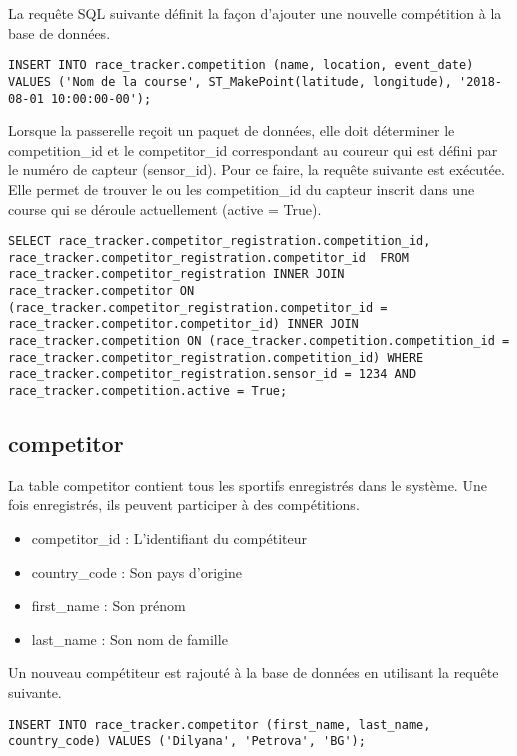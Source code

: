 La requête SQL suivante définit la façon d'ajouter une nouvelle compétition à la base de données.

\begin{lstlisting}[style=SQLStyle]
INSERT INTO race_tracker.competition (name, location, event_date) VALUES ('Nom de la course', ST_MakePoint(latitude, longitude), '2018-08-01 10:00:00-00');
\end{lstlisting}

Lorsque la passerelle reçoit un paquet de données, elle doit déterminer le competition\_id et le competitor\_id correspondant au coureur qui est défini par le numéro de capteur (sensor\_id). Pour ce faire, la requête suivante est exécutée. Elle permet de trouver le ou les competition\_id du capteur inscrit dans une course qui se déroule actuellement (active = True).

\begin{lstlisting}[style=SQLStyle]
SELECT race_tracker.competitor_registration.competition_id, race_tracker.competitor_registration.competitor_id  FROM race_tracker.competitor_registration INNER JOIN race_tracker.competitor ON (race_tracker.competitor_registration.competitor_id = race_tracker.competitor.competitor_id) INNER JOIN race_tracker.competition ON (race_tracker.competition.competition_id = race_tracker.competitor_registration.competition_id) WHERE race_tracker.competitor_registration.sensor_id = 1234 AND race_tracker.competition.active = True;
\end{lstlisting}

\subsection{competitor}

La table competitor contient tous les sportifs enregistrés dans le système. Une fois enregistrés, ils peuvent participer à des compétitions.

\begin{itemize}
\item competitor\_id : L'identifiant du compétiteur
\item country\_code : Son pays d'origine
\item first\_name : Son prénom
\item last\_name : Son nom de famille
\end{itemize}

Un nouveau compétiteur est rajouté à la base de données en utilisant la requête suivante.

\begin{lstlisting}[style=SQLStyle]
INSERT INTO race_tracker.competitor (first_name, last_name, country_code) VALUES ('Dilyana', 'Petrova', 'BG');
\end{lstlisting}

